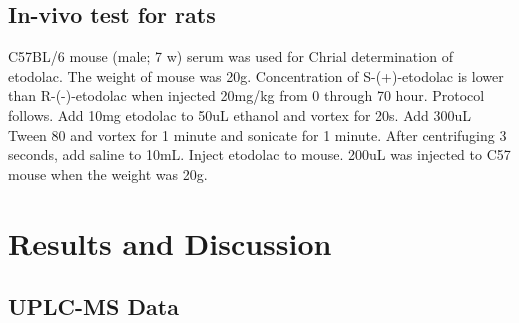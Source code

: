 \documentclass[12pt]{article} %
\begin{document}
\subsection {In-vivo test for rats}
 C57BL/6 mouse (male; 7 w) serum was used for Chrial determination of \linebreak etodolac. The weight of mouse was 20g. Concentration of S-(+)-etodolac is lower than R-(-)-etodolac when injected 20mg/kg from 0 through 70 hour.\cite{cite2}
  Protocol follows. Add 10mg etodolac to 50uL ethanol and vortex for 20s. Add 300uL Tween 80 and vortex for 1 minute and sonicate for 1 minute. After centrifuging 3 seconds, add saline to 10mL. Inject etodolac to mouse.
  200uL was injected to C57 mouse when the weight was 20g.


  

\newpage

\section {Results and Discussion}

\subsection {UPLC-MS Data}
\end{document}
